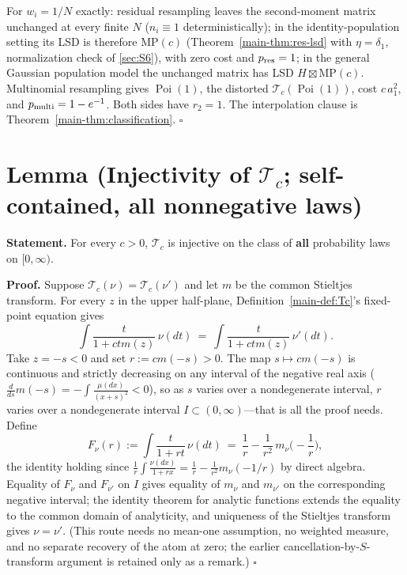For $w_i=1/N$ exactly: residual resampling leaves the second-moment matrix unchanged at every finite $N$ ($n_i\equiv1$ deterministically); in the identity-population setting its LSD is therefore $\mathrm{MP}(c)$ (Theorem~\ref{main-thm:res-lsd} with $\eta=\delta_1$, normalization check of \ref{sec:S6}), with zero cost and $p_{\rm res}=1$; in the general Gaussian population model the unchanged matrix has LSD $H\boxtimes\mathrm{MP}(c)$. Multinomial resampling gives $\operatorname{Poi}(1)$, the distorted $\mathcal T_c(\operatorname{Poi}(1))$, cost $c\,a_1^2$, and $p_{\rm multi}=1-e^{-1}$. Both sides have $r_2=1$. The interpolation clause is Theorem~\ref{main-thm:classification}. $\square$

\section{Lemma (Injectivity of $\mathcal T_c$; self-contained, all nonnegative laws)}\label{sec:S21}

\textbf{Statement.} For every $c>0$, $\mathcal T_c$ is injective on the class of \textbf{all} probability laws on $[0,\infty)$.

\textbf{Proof.} Suppose $\mathcal T_c(\nu)=\mathcal T_c(\nu')$ and let $m$ be the common Stieltjes transform. For every $z$ in the upper half-plane, Definition~\ref{main-def:Tc}'s fixed-point equation gives
\[
\int\frac{t}{1+ctm(z)}\,\nu(dt)\ =\ \int\frac{t}{1+ctm(z)}\,\nu'(dt).
\]
Take $z=-s<0$ and set $r:=cm(-s)>0$. The map $s\mapsto cm(-s)$ is continuous and strictly decreasing on any interval of the negative real axis ($\frac{d}{ds}m(-s)=-\int\frac{\mu(dx)}{(x+s)^2}<0$), so as $s$ varies over a nondegenerate interval, $r$ varies over a nondegenerate interval $I\subset(0,\infty)$—that is all the proof needs. Define
\[
F_\nu(r):=\int\frac{t}{1+rt}\,\nu(dt)\ =\ \frac1r-\frac1{r^2}\,m_\nu\Big(-\frac1r\Big),
\]
the identity holding since $\frac1r\int\frac{\nu(dx)}{1+rx}=\frac1r-\frac1{r^2}m_\nu(-1/r)$ by direct algebra. Equality of $F_\nu$ and $F_{\nu'}$ on $I$ gives equality of $m_\nu$ and $m_{\nu'}$ on the corresponding negative interval; the identity theorem for analytic functions extends the equality to the common domain of analyticity, and uniqueness of the Stieltjes transform gives $\nu=\nu'$. (This route needs no mean-one assumption, no weighted measure, and no separate recovery of the atom at zero; the earlier cancellation-by-$S$-transform argument is retained only as a remark.) $\square$

